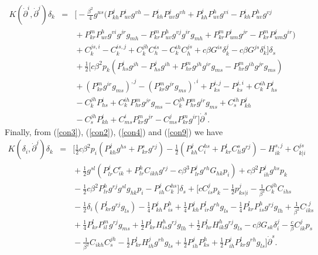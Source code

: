 \documentclass[10pt,a4paper]{article}
\theoremstyle{plain}
\theoremstyle{definition}
\begin{document}
\begin{eqnarray}
K({\dot{\partial}}^i,{\dot{\partial}}^j)\delta_k\!\!\!\!&=&\!\!\!\!\Big[-
\frac{\beta^2}{4}g^{us}(P^j_{kh}P^i_{uv}g^{vh}-P^i_{kh}P^j_{uv}g^{vh}+P^j_{kh}P^h_{uv}g^{vi}-P^i_{kh}P^h_{uv}g^{vj}\nonumber\\
\!\!\!\!&&\!\!\!\!+P^m_{kr}P^h_{uv}g^{vi}g^{jr}g_{mh}-P^m_{kr}P^h_{uv}g^{vj}g^{ir}g_{mh}
+P^m_{kr}P^i_{um}g^{jr}-P^m_{kr}P^j_{um}g^{ir})\nonumber\\
\!\!\!\!&&\!\!\!\!+C^{js,i}_k-C^{is,j}_k+C^{jh}_kC^{is}_h-C^{ih}_kC^{js}_h+c\beta
G^{is}\delta^j_k-c\beta
G^{js}\delta^i_k\Big]\delta_s\nonumber\\
\!\!\!\!&&\!\!\!\!
+\frac{1}{2}\Big[c\beta^2p_k(P^i_{hs}g^{jh}-P^j_{hs}g^{ih}+P^m_{hr}g^{jh}g^{ir}g_{ms}-P^m_{hr}g^{ih}g^{jr}g_{ms})
\nonumber\\
\!\!\!\!&&\!\!\!\!
+(P^m_{kr}g^{ir}g_{ms})^{,j}-(P^m_{kr}g^{jr}g_{ms})^{,i}+P^{i,j}_{ks}-P^{j,i}_{ks}+C^{ih}_kP^j_{hs}
\nonumber\\
\!\!\!\!&&\!\!\!\!
-C^{jh}_kP^i_{hs}+C^{ih}_kP^m_{hr}g^{jr}g_{ms}-C^{jh}_kP^m_{hr}g^{ir}g_{ms}+C^{ih}_sP^j_{kh}
\nonumber\\
\!\!\!\!&&\!\!\!\!-C^{jh}_sP^i_{kh}+C^i_{ms}P^m_{kr}g^{jr}-C^j_{ms}P^m_{kr}g^{ir}\Big]{\dot{\partial}}^s.\label{curvature16}
\end{eqnarray}
Finally, from (\ref{con3}), (\ref{con2}), (\ref{con4}) and
(\ref{con9}) we have
\begin{eqnarray}
K(\delta_i,{\dot{\partial}}^j)\delta_k\!\!\!\!&=&\!\!\!\!
\Big[\frac{1}{2}c\beta^2p_i(P^j_{kh}g^{hs}+P^s_{kr}g^{rj})-\frac{1}{2}(P^j_{kh}C^{hs}_i
+P^l_{kr}C^s_{li}g^{rj})-H^{s,j}_{ik}+C^{js}_{k|i}\nonumber\\
\!\!\!\!&&\!\!\!\!
+\frac{1}{2}g^{sl}(P^j_{lr}C^r_{ik}+P^h_{lr}C_{ikh}g^{rj}-c\beta^3P^j_{lr}g^{rh}G_{hk}p_i)
+c\beta^2P^j_{ih}g^{hs}p_k\nonumber\\
\!\!\!\!&&\!\!\!\!-\frac{1}{2}c\beta^2P^h_{lr}g^{rj}g^{sl}g_{hk}p_i-P^j_{ih}C^{hs}_k\Big]\delta_s
+\Big[cC^j_{is}p_k-\frac{1}{2}p^j_{ks|i}-\frac{1}{\beta^2}C^{jh}_kC_{ihs}
\nonumber\\
\!\!\!\!&&\!\!\!\!-\frac{1}{2}\delta_i(P^l_{kr}g^{rj}g_{ls})-\frac{1}{4}P^j_{kh}P^h_{is}+\frac{1}{4}P^j_{kh}P^l_{ir}g^{rh}g_{ls}
-\frac{1}{4}P^l_{kr}P^h_{is}g^{rj}g_{lh}+\frac{1}{\beta^2}C^{,j}_{iks}\nonumber\\
\!\!\!\!&&\!\!\!\!+\frac{1}{4}P^l_{kr}P^m_{il}g^{rj}g_{ms}+\frac{1}{2}P^l_{kr}H^h_{is}g^{rj}g_{lh}+\frac{1}{2}P^l_{hr}H^h_{ik}g^{rj}g_{ls}-c\beta
G_{sk}\delta^j_i-\frac{c}{\beta}C^j_{ik}p_s\nonumber\\
\!\!\!\!&&\!\!\!\!-\frac{1}{\beta^2}C_{ikh}C^{jh}_s-\frac{1}{2}P^l_{kr}H^j_{ih}g^{rh}g_{ls}+\frac{1}{2}P^j_{ih}P^h_{ks}
+\frac{1}{2}P^j_{ih}P^l_{kr}g^{rh}g_{ls}\Big]{\dot{\partial}}^s.\label{curvature17}
\end{eqnarray}
\end{document}
